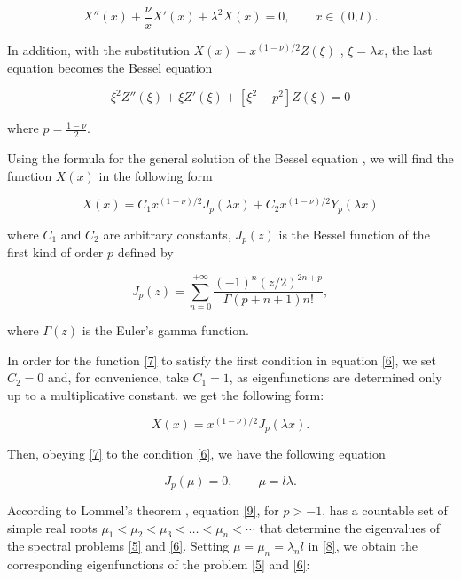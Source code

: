 \documentclass[reqno]{amsart}
\theoremstyle{definition}
\numberwithin{equation}{section}
\begin{document}
\begin{equation}\label{eq5}
    X''(x)+\frac{\nu}{x}X'(x)+\lambda^2{X(x)}=0, \qquad x\in(0,l).
\end{equation}

In addition, with the substitution $X(x)=x^{(1-\nu)/2}Z(\xi)$ , $ \xi=\lambda x$, the last equation becomes the Bessel equation 

\begin{equation*}
    \xi^{2}Z''(\xi)+\xi{Z'(\xi)}+\left[\xi^2-p^2\right]Z(\xi)=0
\end{equation*}

where $p=\frac{1-\nu}{2}$.

Using the formula for the general solution of the Bessel equation \cite{bib6}, we will find the function $X(x)$ in the following  form 

\begin{equation}\label{7}
    X(x)=C_{1}x^{(1-\nu)/2}J_p(\lambda x)+C_2x^{(1-\nu)/2}Y_p(\lambda x)
\end{equation}

where $C_1$ and $C_2$ are arbitrary constants, $J_p(z)$ is the Bessel function of  the first kind of order $p$ defined by \cite{Watson}

\begin{equation*}
    J_p(z)=\sum_{n=0}^{+\infty} \frac{(-1)^n(z/2)^{2n+p}}{\Gamma(p+n+1)n!},
\end{equation*}

where $\Gamma(z)$ is the Euler's gamma function. 

In order for the function \eqref{7} to satisfy the first condition in equation \eqref{6}, we set  $C_2=0$ and, for convenience, take $C_1=1$, as eigenfunctions are determined only up to a multiplicative constant. we get the following form:

\begin{equation}\label{8}
    X(x)=x^{(1-\nu)/2}J_p(\lambda x).
\end{equation}

Then, obeying \eqref{7} to the condition \eqref{6}, we have the following equation 

\begin{equation}\label{9}
    J_p(\mu)=0, \qquad \mu=l\lambda.
\end{equation}

According to Lommel’s theorem \cite{Watson}, equation \eqref{9}, for $p>-1$, has a countable set of simple real roots 
$\mu_1<\mu_2<\mu_3<\dots<\mu_n<\cdots$ that determine the eigenvalues of the spectral problems \eqref{5} and \eqref{6}.
Setting $\mu=\mu_n=\lambda_nl$ in \eqref{8}, we obtain the corresponding eigenfunctions of the problem \eqref{5} and \eqref{6}:
\end{document}
